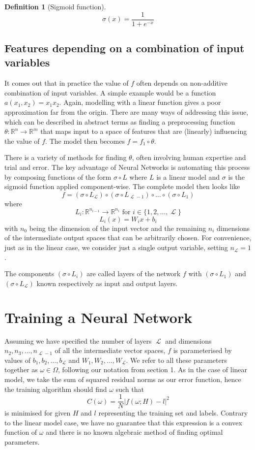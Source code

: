 \documentclass[a4paper]{article}
\theoremstyle{break}
\newtheorem{definition}{Definition}[section]
\newcommand{\R}{\mathbb{R}}
\DeclareMathOperator{\La}{\mathcal{L}}
\begin{document}
\begin{definition}[Sigmoid function]
    $$ \sigma(x) = \frac{1}{1 + e^{-x}}$$
\end{definition}

 
\subsection{Features depending on a combination of input variables}
It comes out that in practice the value of $f$ often depends on non-additive combination of input variables. A simple example would be a function $a(x_1, x_2) = x_1 x_2$. Again, modelling with a linear function gives a poor approximation far from the origin.
There are many ways of addressing this issue, which can be described in abstract terms as finding a preprocessing function $ \theta : \R^n \to \R^m$ that maps input to a space of features that are (linearly) influencing the value of $f$. The model then becomes $ f = f_1 \circ \theta $.

There is a variety of methods for finding $\theta$, often involving human expertise and trial and error. The key advantage of Neural Networks is automating this process by composing functions of the form $ \sigma \circ L$ where $L$ is a linear model and $\sigma$ is the sigmoid function applied component-wise.
The complete model then looks like
$$ f = (\sigma \circ L_{\La}) \circ (\sigma \circ L_{\La - 1}) \circ \ldots \circ (\sigma \circ L_{1}) $$
where
$$ L_i : \R^{n_{i-1}} \to \R^{n_{i}} \text{ for } i \in \{1, 2, \ldots, \La \} $$
$$ L_i(x) = W_i x + b_i $$
with $ n_0 $ being the dimension of the input vector and the remaining $ n_i $ dimensions of the intermediate output spaces that can be arbitrarily chosen. For convenience, just as in the linear case, we consider just a single output variable, setting $ n_{\La} = 1 $. 

The components $ (\sigma \circ L_{i}) $ are called layers of the network $f$ with $ (\sigma \circ L_{1}) $ and $ (\sigma \circ L_{\La}) $ known respectively as input and output layers.

\section{Training a Neural Network}

Assuming we have specified the number of layers $ \La $ and dimensions $ n_2, n_3, \ldots, n_{\La-1} $ of all the intermediate vector spaces,
$f$ is parameterised by values of $ b_1, b_2, \ldots, b_{\La} $ and $ W_1, W_2, \ldots, W_{\La} $.
We refer to all these parameters together as $ \omega \in \Omega $, following our notation from section 1.
As in the case of linear model, we take the sum of squared residual norms as our error function, hence the training algorithm should find $ \omega $ such that
    $$ C(\omega) =  \frac{1}{N} | f(\omega; H) - l |^2  $$
is minimised for given $H$ and $l$ representing the training set and labels.
Contrary to the linear model case, we have no guarantee that this expression is a convex function of $ \omega $ and there is no known algebraic method of finding optimal parameters.
\end{document}
